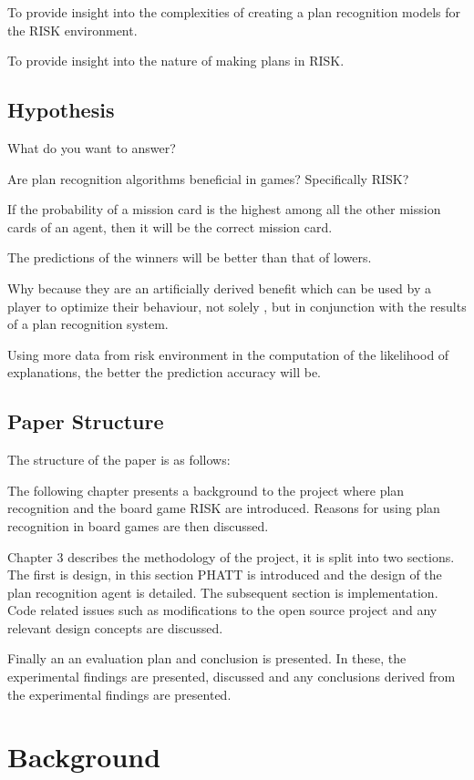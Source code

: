 \documentclass[parskip]{cs4rep}
\begin{document}
To provide insight into the complexities of creating a plan recognition models for the RISK environment.

To provide insight into the nature of making plans in RISK. 

\section{Hypothesis}

What do you want to answer?

Are plan recognition algorithms beneficial in games? Specifically RISK?

If the probability of a mission card is the highest among all the other mission cards of an agent, then it will be the correct mission card.

The predictions of the winners will be better than that of lowers.

Why because they are an artificially derived benefit which can be used by a player to optimize their behaviour, not solely , but in conjunction with the results of a plan recognition system.

Using more data from risk environment in the computation of the likelihood of explanations, the better the prediction accuracy will be.

\section{Paper Structure}

The structure of the paper is as follows:

The following chapter presents a background to the project where plan recognition and the board game RISK are introduced. Reasons for using plan recognition in board games are then discussed.

Chapter 3 describes the methodology of the project, it is split into two sections. The first is design, in this section PHATT is introduced and the design of the plan recognition agent is detailed. The subsequent section is implementation. Code related issues such as modifications to the open source project and any relevant design concepts are discussed. 

Finally an an evaluation plan and conclusion is presented. In these, the experimental findings are presented, discussed and any conclusions derived from the experimental findings are presented.

\chapter{Background}
\end{document}
